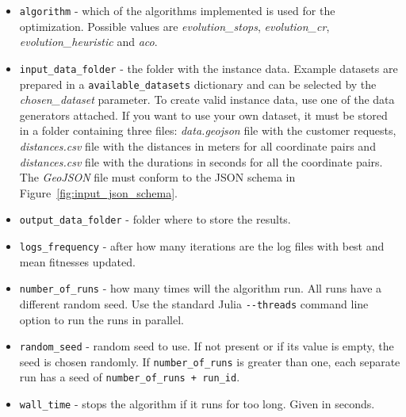 \begin{itemize}
    \setlength\itemsep{0pt}
    \item \texttt{algorithm} - which of the algorithms implemented is used for the optimization. Possible values are \textit{evolution\_stops}, \textit{evolution\_cr}, \textit{evolution\_heuristic} and \textit{aco}.
    \item \texttt{input\_data\_folder} - the folder with the instance data. Example datasets are prepared in a \texttt{available\_datasets} dictionary and can be selected by the \textit{chosen\_dataset} parameter. To create valid instance data, use one of the data generators attached. If you want to use your own dataset, it must be stored in a folder containing three files: \textit{data.geojson} file with the customer requests, \textit{distances.csv} file with the distances in meters for all coordinate pairs and \textit{distances.csv} file with the durations in seconds for all the coordinate pairs. The \textit{GeoJSON} file must conform to the JSON schema in Figure~\ref{fig:input_json_schema}.
    \item \texttt{output\_data\_folder} - folder where to store the results.
    \item \texttt{logs\_frequency} - after how many iterations are the log files with best and mean fitnesses updated.
    \item \texttt{number\_of\_runs} - how many times will the algorithm run. All runs have a different random seed. Use the standard Julia \texttt{-{}-threads} command line option to run the runs in parallel.
    \item \texttt{random\_seed} - random seed to use. If not present or if its value is empty, the seed is chosen randomly. If \texttt{number\_of\_runs} is greater than one, each separate run has a seed of \texttt{number\_of\_runs + run\_id}. 
    \item \texttt{wall\_time} - stops the algorithm if it runs for too long. Given in seconds. 
\end{itemize}


